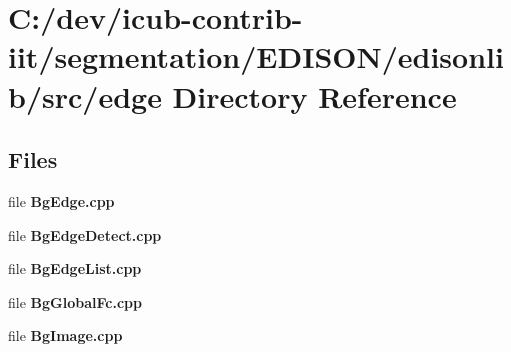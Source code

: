 \section{C\+:/dev/icub-\/contrib-\/iit/segmentation/\+E\+D\+I\+S\+O\+N/edisonlib/src/edge Directory Reference}
\label{dir_a850469184cc141cb5a86c96c4a2639d}
\subsection*{Files}
\begin{DoxyCompactItemize}
\item 
file {\bfseries Bg\+Edge.\+cpp}
\item 
file {\bfseries Bg\+Edge\+Detect.\+cpp}
\item 
file {\bfseries Bg\+Edge\+List.\+cpp}
\item 
file {\bfseries Bg\+Global\+Fc.\+cpp}
\item 
file {\bfseries Bg\+Image.\+cpp}
\end{DoxyCompactItemize}
